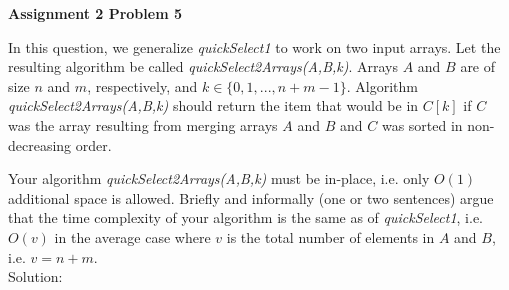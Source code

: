 \documentclass[12pt]{article}
\begin{document}
	
	\begin{center}
		{\Large\bf Assignment 2 Problem 5}\\
		\vspace{3mm}
	\end{center}
	
	\def\question#1{\item[\bf #1.]}
	\def\part#1{\item[\bf #1)]}
	\newcommand{\pc}[1]{\mbox{\textbf{#1}}} %
	
	
	
	In this question, we generalize \textit{quickSelect1} to work on two input arrays. 
	Let the resulting algorithm be called \emph{quickSelect2Arrays(A,B,k)}.
	Arrays $A$ and $B$ are of size $n$ and $m$, respectively, and $k\in \{ 0,1,...,n+m-1 \}$. 
	Algorithm \emph{quickSelect2Arrays(A,B,k)} should return the item that would be in $C[k]$ if $C$ was the array resulting from merging arrays $A$ and $B$ and $C$ was sorted in non-decreasing order. 
	
	\bigskip
	
	\noindent Your algorithm \emph{quickSelect2Arrays(A,B,k)} must be in-place, i.e. only $O(1)$ additional space is allowed.
	Briefly and informally (one or two sentences) argue that the time complexity of your algorithm is the same as of \emph{quickSelect1}, i.e. $O(v)$ in the average case where $v$ is the total number of elements in $A$ and $B$, i.e. $v=n+m$.\\
	
	
	Solution:
	
\end{document}
